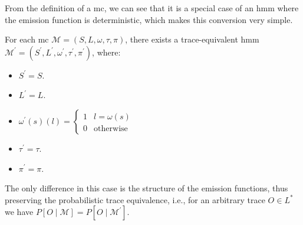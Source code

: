 From the definition of a \gls{mc}, we can see that it is a special case of an \gls{hmm} where the emission function is deterministic, which makes this conversion very simple.


\begin{definition}
    For each \gls{mc} $\mathcal{M} = (S, L, \omega, \tau, \pi)$, there exists a trace-equivalent \gls{hmm} $\mathcal{M}^{\prime} = (S^{\prime}, L^{\prime}, \omega^{\prime}, \tau^{\prime}, \pi^{\prime})$, where:
    \begin{itemize}
        \item $S^{\prime} = S$.
        \item $L^{\prime} = L$.
        \item $\omega^{\prime}(s)(l) = \begin{cases}
                      1 & l=\omega(s)      \\
                      0 & \text{otherwise}
                  \end{cases}$
        \item $\tau^{\prime} = \tau$.
        \item $\pi^{\prime} = \pi$.
    \end{itemize}
\end{definition}


The only difference in this case is the structure of the emission functions, thus preserving the probabilistic trace equivalence, i.e., for an arbitrary trace $O \in L^*$ we have $P[O \mid \mathcal{M}] = P[O \mid \mathcal{M}^{\prime}]$.

